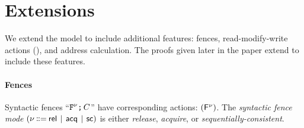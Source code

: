 \section{Extensions}
\label{sec:variants}

We extend the model to include additional features: fences, read-modify-write
actions (\RMWs), and address calculation. The proofs given later in the paper
extend to include these features.

\paragraph{Fences}

Syntactic fences
``$\texttt{F}^{\nu} \texttt{;}\,\allowbreak C$'' have corresponding  actions: $(\smash{\mathsf{F}^{\nu}})$.  The \emph{syntactic fence mode}
$(\fmode \!\!\BNFDEF\!\! \modeREL \!\BNFSEP\! \modeACQ \!\BNFSEP\! \modeSC)$
is either \emph{release}, \emph{acquire}, or \emph{sequentially-consistent}.

